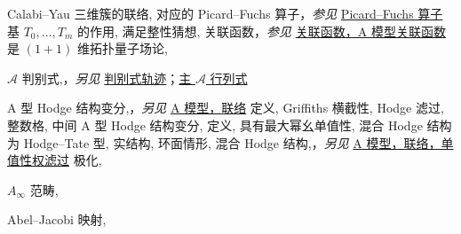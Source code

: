 \begin{theindex}
\subsubitem \leavevmode\hypertarget{idx:0013}{Calabi--Yau 三维簇的联络},\enspace{}
\subsubitem \leavevmode\hypertarget{idx:0014}{对应的 Picard--Fuchs 算子}，\textit{参见} \hyperlink{idx:1062}{Picard--Fuchs 算子}
\subsubitem \leavevmode\hypertarget{idx:0015}{基 $T_0,\ldots,T_m$ 的作用},\enspace{}
\subsubitem \leavevmode\hypertarget{idx:0016}{满足整性猜想},\enspace{}
\subitem \leavevmode\hypertarget{idx:0017}{关联函数}，\textit{参见} \hyperlink{idx:0184}{关联函数，A 模型关联函数}
\subitem \leavevmode\hypertarget{idx:0018}{是 $(1+1)$ 维拓扑量子场论},\enspace{}
\indexspace
\item \leavevmode\hypertarget{idx:0037}{$\mathcal A$ 判别式},\enspace{}，\textit{另见} \hyperlink{idx:0214}{判别式轨迹}；\hyperlink{idx:1093}{主 $\mathcal A$ 行列式}
\indexspace
\item \leavevmode\hypertarget{idx:0019}{A 型 Hodge 结构变分},\enspace{}，\textit{另见} \hyperlink{idx:0003}{A 模型，联络}
\subitem \leavevmode\hypertarget{idx:0020}{定义},\enspace{}
\subitem \leavevmode\hypertarget{idx:0021}{Griffiths 横截性},\enspace{}
\subitem \leavevmode\hypertarget{idx:0022}{Hodge 滤过},\enspace{}
\subitem \leavevmode\hypertarget{idx:0023}{整数格},\enspace{}
\subitem \leavevmode\hypertarget{idx:0024}{中间 A 型 Hodge 结构变分},\enspace{}
\subsubitem \leavevmode\hypertarget{idx:0025}{定义},\enspace{}
\subsubitem \leavevmode\hypertarget{idx:0026}{具有最大幂幺单值性},\enspace{}
\subsubitem \leavevmode\hypertarget{idx:0027}{混合 Hodge 结构为 Hodge--Tate 型},\enspace{}
\subsubitem \leavevmode\hypertarget{idx:0028}{实结构},\enspace{}
\subsubitem \leavevmode\hypertarget{idx:0029}{环面情形},\enspace{}
\subitem \leavevmode\hypertarget{idx:0030}{混合 Hodge 结构},\enspace{}，\textit{另见} \hyperlink{idx:0012}{A 模型，联络，单值性权滤过}
\subitem \leavevmode\hypertarget{idx:0031}{极化},\enspace{}
\indexspace
\item \leavevmode\hypertarget{idx:0001}{$A_\infty$ 范畴},\enspace{}
\indexspace
\item \leavevmode\hypertarget{idx:0032}{Abel--Jacobi 映射},\enspace{}

\end{theindex}
